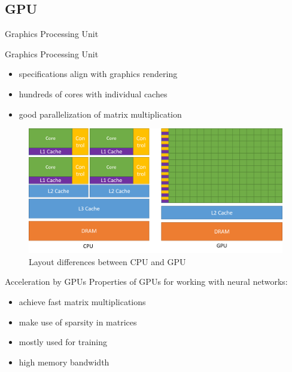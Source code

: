 \documentclass[en]{sdqbeamer}
\begin{document}
\subsection{GPU}
\begin{frame}{Graphics Processing Unit}
	\begin{minipage}[b]{0.45\paperwidth}
		Graphics Processing Unit
		\begin{itemize}
			\item specifications align with graphics rendering
			\item hundreds of cores with individual caches
			\item good parallelization of matrix multiplication
		\end{itemize}
	\end{minipage}
	\begin{minipage}{0.45\paperwidth}
		\begin{figure}
			\includegraphics[width= 0.47\paperwidth, right]{pictures/intel_comparison.png}
			\caption{Layout differences between CPU and GPU \cite{intelpic_comparison}}
		\end{figure}
	\end{minipage}
\end{frame}

\begin{frame}{Acceleration by GPUs}
	Properties of GPUs for working with neural networks:
	\begin{itemize}
		\item achieve fast matrix multiplications
		\item make use of sparsity in matrices
		\item mostly used for training
		\item high memory bandwidth
	\end{itemize}
\end{frame}
\end{document}
